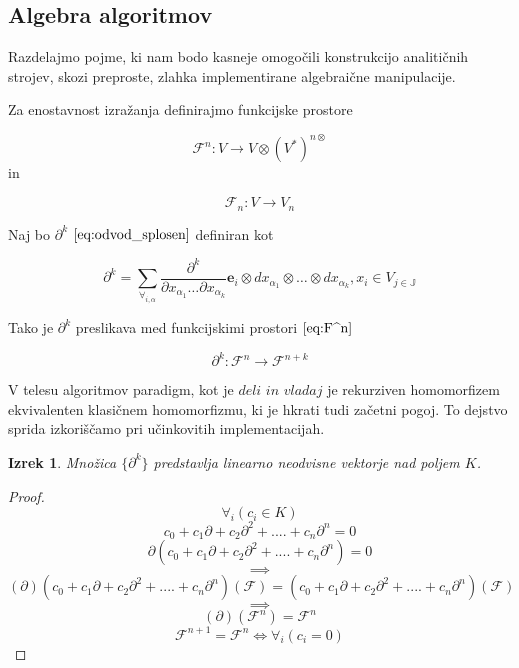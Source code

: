 \documentclass{article}
\newcommand{\JJ}{\mathbb{J}}
\newcommand{\e}{\mathbf{e}}
\newcommand{\F}{\mathcal{F}}
\newcommand{\D}{\partial}
\newtheorem{izrek}{Izrek}[section]
\begin{document}
 \subsection{Algebra algoritmov}

Razdelajmo pojme, ki nam bodo kasneje omogočili konstrukcijo analitičnih strojev, skozi preproste, zlahka implementirane algebraične manipulacije.

Za enostavnost izražanja definirajmo funkcijske prostore

 \begin{equation}\label{eq:F^n}
 	\F^n:V\to V\otimes(V^*)^{n\otimes}
 \end{equation}
 in
 
 \begin{equation}\label{eq:F_n}
 	\F_n:V\to V_n
 \end{equation}
 
Naj bo $\D^k$ $\eqref{eq:odvod_splosen}$ definiran kot

\begin{equation}\label{eq:dd}
	\partial^k=\sum_{\forall_{i,\alpha}}\frac{\partial^k}{\partial
	    x_{\alpha_1}\ldots \partial x_{\alpha_k}}\e_i\otimes
	  dx_{\alpha_1}\otimes\ldots \otimes dx_{\alpha_k} , x_i\in V_{j\in\JJ}
\end{equation}

Tako je $\D^k$ preslikava med funkcijskimi prostori $\eqref{eq:F^n}$
 
 \begin{equation}\label{eq:toFn+k}
 \D^k:\F^n\to\F^{n+k}
 \end{equation}
 

 V telesu algoritmov paradigm, kot je $\textit{deli in vladaj}$ je rekurziven homomorfizem ekvivalenten klasičnem homomorfizmu, ki je hkrati tudi začetni pogoj. To dejstvo sprida izkoriščamo pri učinkovitih implementacijah.
 
 \begin{izrek}\label{izr:linearnaNeodvisnost}
  Množica $\{\partial^k\}$ predstavlja linearno neodvisne vektorje nad poljem $K$.
 \end{izrek}
 
 \begin{proof} 
 $$\forall_i(c_i\in K)$$
	  $$c_0+c_1\D+c_2\D^2+....+c_n\D^n=0$$
	$$\D(c_0+c_1\D+c_2\D^2+....+c_n\D^n)=0$$
	$$\implies$$
	$$(\D)(c_0+c_1\D+c_2\D^2+....+c_n\D^n)(\F)=(c_0+c_1\D+c_2\D^2+....+c_n\D^n)(\F)$$
	$$\implies$$
	$$(\D)(\F^n)=\F^n$$
	$$\F^{n+1}=\F^n\iff\forall_i(c_i=0)$$
	
 \end{proof}
 
\end{document}

